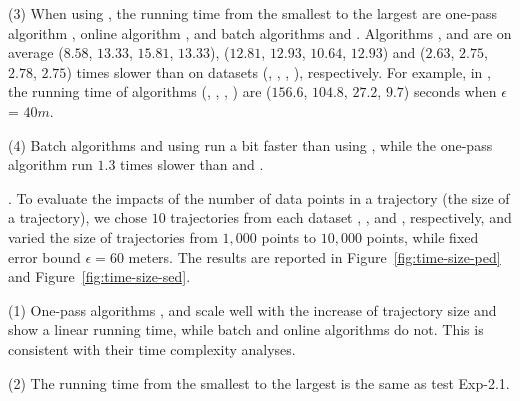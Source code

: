 \sstab (3) When using \sed, the running time from the smallest to the largest are one-pass algorithm \cised, online algorithm \squishe, and batch algorithms \tpa and \dpa. 
Algorithms \tpa, \dpa and \squishe are on average
($8.58$, $13.33$, $15.81$, $13.33$), ($12.81$, $12.93$, $10.64$, $12.93$) and
($2.63$, $2.75$, $2.78$, $2.75$) times slower than \cised on datasets (\ucar, \geolife, \mopsi, \act), respectively.
%
For example, in \mopsi, the running time of algorithms
(\tpa, \dpa, \squishe, \cised) are  ($156.6$, $104.8$, $27.2$, $9.7$) seconds when $\epsilon$ = $40m$.

\sstab (4) Batch algorithms \dpa and \tpa using \sed run a bit faster than using
\ped, while the one-pass algorithm \cised run $1.3$ times slower than \siped and \operb.




.
To evaluate the impacts of the number of data points in a trajectory (\ie the size of a trajectory),
we chose $10$ trajectories from each dataset \ucar, \geolife, \mopsi and \act, respectively,
and varied the size  of trajectories from $1,000$ points to $10,000$ points, while fixed error bound $\epsilon = 60$ meters.
The results are reported in Figure~\ref{fig:time-size-ped} and Figure~\ref{fig:time-size-sed}.

\sstab(1) One-pass algorithms \siped, \operb and \cised scale well with the increase of trajectory size  and show a linear running time, while batch and online algorithms do not.
This is consistent with their time complexity analyses.

\sstab(2) The running time from the smallest to the largest is the same as test {Exp-2.1}.



